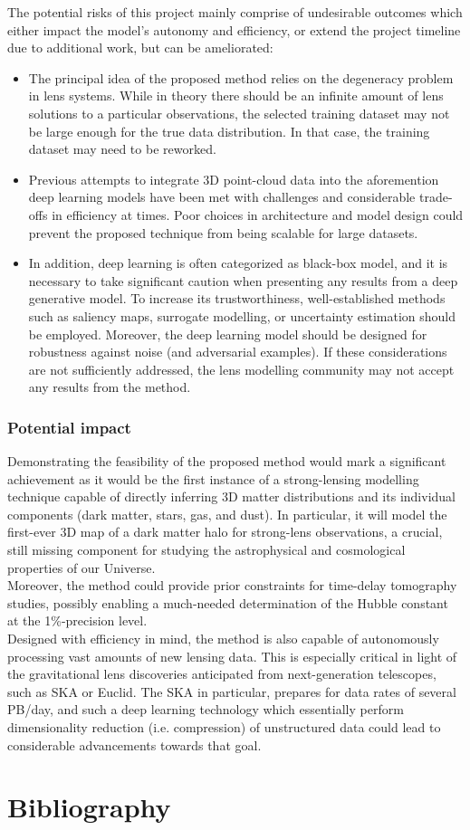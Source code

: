 \documentclass[a4paper,10pt]{article}
\begin{document}
The potential risks of this project mainly comprise of undesirable
outcomes which either impact the model's autonomy and efficiency, or
extend the project timeline due to additional work, but can be
ameliorated:
\begin{itemize}[leftmargin=*, noitemsep]
\item The principal idea of the proposed method relies on the degeneracy
problem in lens systems. While in theory there should be an infinite
amount of lens solutions to a particular observations, the selected
training dataset may not be large enough for the true data
distribution. In that case, the training dataset may need to be
reworked.
\item Previous attempts to integrate 3D point-cloud data into the
aforemention deep learning models have been met with challenges and
considerable trade-offs in efficiency at times. Poor choices in
architecture and model design could prevent the proposed technique
from being scalable for large datasets.
\item In addition, deep learning is often categorized as black-box model,
and it is necessary to take significant caution when presenting any
results from a deep generative model. To increase its trustworthiness,
well-established methods such as saliency maps, surrogate modelling,
or uncertainty estimation should be employed. Moreover, the deep
learning model should be designed for robustness against noise (and
adversarial examples). If these considerations are not sufficiently
addressed, the lens modelling community may not accept any results
from the method.
\end{itemize}

\subsubsection{Potential impact}
\label{sec:orgaa19114}

Demonstrating the feasibility of the proposed method would mark a
significant achievement as it would be the first instance of a
strong-lensing modelling technique capable of directly inferring 3D
matter distributions and its individual components (dark matter,
stars, gas, and dust).  In particular, it will model the first-ever 3D
map of a dark matter halo for strong-lens observations, a crucial,
still missing component for studying the astrophysical and
cosmological properties of our Universe. \\[0pt]
Moreover, the method could provide prior constraints for time-delay
tomography studies, possibly enabling a much-needed determination of
the Hubble constant at the 1\%-precision level. \\[0pt]
Designed with efficiency in mind, the method is also capable of
autonomously processing vast amounts of new lensing data. This is
especially critical in light of the gravitational lens discoveries
anticipated from next-generation telescopes, such as SKA or
Euclid. The SKA in particular, prepares for data rates of several
PB/day, and such a deep learning technology which essentially perform
dimensionality reduction (i.e. compression) of unstructured data could
lead to considerable advancements towards that goal.


\newpage
\section{Bibliography}
\label{sec:orgdac70d7}



\end{document}
